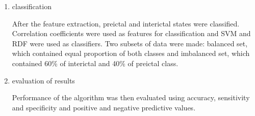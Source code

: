 \documentclass{article}
\begin{document}
\begin{enumerate}


\item classification

After the feature extraction, preictal and interictal states were classified. Correlation coefficients were used as features for classification and SVM and RDF were used as classifiers. Two subsets of data were made: balanced set, which contained equal proportion of both classes and imbalanced set, which contained 60\% of interictal and 40\% of preictal class.  

\item evaluation of results

Performance of the algorithm was then evaluated using accuracy, sensitivity and specificity and positive and negative predictive values. 


\end{enumerate}
\end{document}
